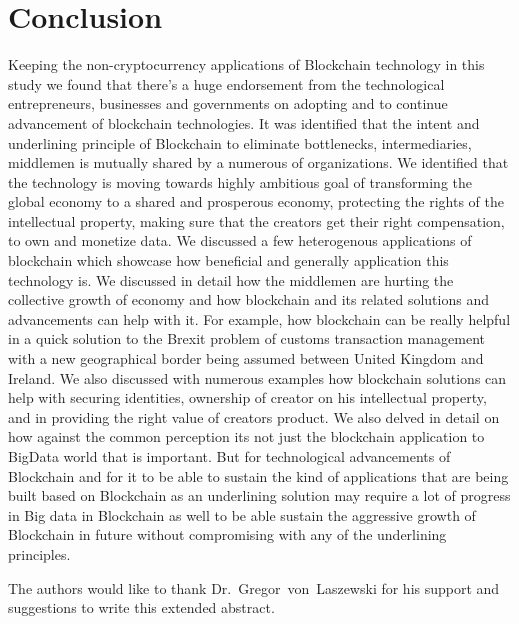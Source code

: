 \section{Conclusion}
Keeping the non-cryptocurrency applications of Blockchain technology in this study we found that there's a huge endorsement from the technological entrepreneurs, businesses and governments on adopting and to continue advancement of blockchain technologies. It was identified that the intent and underlining principle of Blockchain to eliminate bottlenecks, intermediaries, middlemen is mutually shared by a numerous of organizations. We identified that the technology is moving towards highly ambitious goal of transforming the global economy to a shared and prosperous economy, protecting the rights of the intellectual property, making sure that the creators get their right compensation, to own and monetize data. We discussed a few heterogenous applications of blockchain which showcase how beneficial and generally application this technology is. We discussed in detail how the middlemen are hurting the collective growth of economy and how blockchain and its related solutions and advancements can help with it. For example, how blockchain can be really helpful in a quick solution to the Brexit problem of customs transaction management with a new geographical border being assumed between United Kingdom and Ireland. We also discussed with numerous examples how blockchain solutions can help with securing identities, ownership of creator on his intellectual property, and in providing the right value of creators product. We also delved in detail on how against the common perception its not just the blockchain application to BigData world that is important. But for technological advancements of Blockchain and for it to be able to sustain the kind of applications that are being built based on Blockchain as an underlining solution may require a lot of progress in Big data in Blockchain as well to be able sustain the aggressive growth of Blockchain in future without compromising with any of the underlining principles.


\begin{acks}

The authors would like to thank Dr.~Gregor~von~Laszewski for his
support and suggestions to write this extended abstract.

\end{acks}



